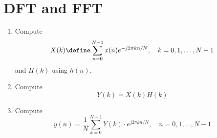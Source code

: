 \documentclass[journal,12pt,twocolumn]{IEEEtran}
\renewcommand\thesection{\arabic{section}}
\begin{document}
\section{DFT and FFT}
\begin{enumerate}[label=\thesection.\arabic*]
	\item
	      Compute
	      \begin{equation}
		      X(k) \define \sum _{n=0}^{N-1}x(n) e^{-j2\pi kn/N}, \quad k = 0,1,\dots, N-1
	      \end{equation}
	      and $H(k)$ using $h(n)$.
	\item Compute
	      \begin{equation}
		      Y(k) = X(k)H(k)
		      \label{eq:fp}
	      \end{equation}
	\item Compute
	      \begin{equation}
		      y(n)={\frac {1}{N}}\sum _{k=0}^{N-1}Y(k)\cdot e^{j 2\pi kn/N},\quad n = 0,1,\dots, N-1
		      \label{eq:inv-ft}
	      \end{equation}


\end{enumerate}
\end{document}
